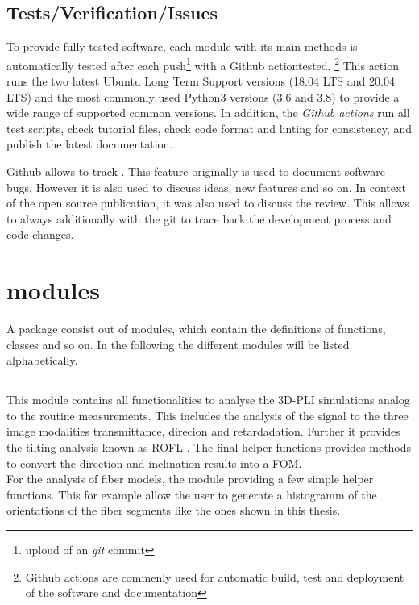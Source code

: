 \subsection{Tests/Verification/Issues}
% 
To provide fully tested software, each module with its main methods is automatically tested after each push\footnote{uploud of an \textit{git} commit} with a Github actiontested. \footnote{Github actions are commenly used for automatic build, test and deployment of the software and documentation} 
This action runs the two latest Ubuntu Long Term Support versions (18.04 LTS and 20.04 LTS) and the most commonly used Python3 versions (3.6 and 3.8) to provide a wide range of supported common versions.
In addition, the \textit{Github actions} run all test scripts, check tutorial files, check code format and linting for consistency, and publish the latest documentation.
% 
\par
% 
Github allows to track .
This feature originally is used to document software bugs.
However it is also used to discuss ideas, new features and so on.
In context of the open source publication, it was also used to discuss the review.
This allows to always additionally with the git  to trace back the development process and code changes.
%
%  
% 
%  
\section{modules}
% 
A \python{} package consist out of modules, which contain the definitions of functions, classes and so on.
In the following the different modules will be listed alphabetically.
% 
% 
% 
\subsection{}
% 
This module contains all functionalities to analyse the \ac{3D-PLI} simulations analog to the routine measurements.
This includes the analysis of the signal to the three image modalities transmittance, direcion and retardadation.
Further it provides the tilting analysis known as \ac{ROFL} \cite{Schmitz2018}.
The final helper functions provides methods to convert the direction and inclination results into a \ac{FOM}.
\\
For the analysis of fiber models, the module providing a few simple helper functions.
This for example allow the user to generate a histogramm of the orientations of the fiber segments like the ones shown in this thesis.
% 
